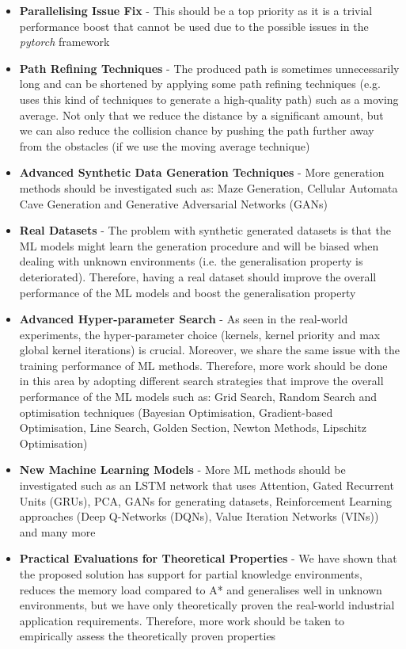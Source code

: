 \begin{itemize}
    \item \textbf{Parallelising Issue Fix} - This should be a top priority as it is a trivial performance boost that cannot be used due to the possible issues in the \textit{pytorch} framework
    \item \textbf{Path Refining Techniques} - The produced path is sometimes unnecessarily long and can be shortened by applying some path refining techniques (e.g. \cite{inoue2019robot} uses this kind of techniques to generate a high-quality path) such as a moving average. Not only that we reduce the distance by a significant amount, but we can also reduce the collision chance by pushing the path further away from the obstacles (if we use the moving average technique)
    \item \textbf{Advanced Synthetic Data Generation Techniques} - More generation methods should be investigated such as: Maze Generation, Cellular Automata Cave Generation and Generative Adversarial Networks (GANs) \cite{ml, Goodfellow-et-al-2016, russell2016artificial, lecun2015deep}
    \item \textbf{Real Datasets} - The problem with synthetic generated datasets is that the ML models might learn the generation procedure and will be biased when dealing with unknown environments (i.e. the generalisation property is deteriorated). Therefore, having a real dataset should improve the overall performance of the ML models and boost the generalisation property
    \item \textbf{Advanced Hyper-parameter Search} - As seen in the real-world experiments, the hyper-parameter choice (kernels, kernel priority and max global kernel iterations) is crucial. Moreover, we share the same issue with the training performance of ML methods. Therefore, more work should be done in this area by adopting different search strategies that improve the overall performance of the ML models such as: Grid Search, Random Search and optimisation techniques (Bayesian Optimisation, Gradient-based Optimisation, Line Search, Golden Section, Newton Methods, Lipschitz Optimisation) \cite{chong2013introduction}
    \item \textbf{New Machine Learning Models} - More ML methods should be investigated such as an LSTM network that uses Attention, Gated Recurrent Units (GRUs), PCA, GANs for generating datasets, Reinforcement Learning approaches (Deep Q-Networks (DQNs), Value Iteration Networks (VINs)) and many more \cite{ml, Goodfellow-et-al-2016, russell2016artificial, lecun2015deep}
    \item \textbf{Practical Evaluations for Theoretical Properties} - We have shown that the proposed solution has support for partial knowledge environments, reduces the memory load compared to A* and generalises well in unknown environments, but we have only theoretically proven the real-world industrial application requirements. Therefore, more work should be taken to empirically assess the theoretically proven properties
\end{itemize}